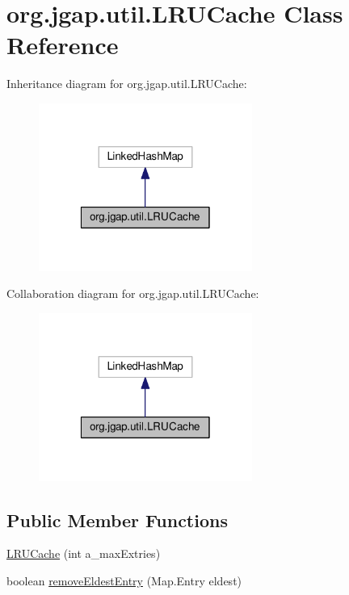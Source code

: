 \hypertarget{classorg_1_1jgap_1_1util_1_1_l_r_u_cache}{\section{org.\-jgap.\-util.\-L\-R\-U\-Cache Class Reference}
\label{classorg_1_1jgap_1_1util_1_1_l_r_u_cache}
}


Inheritance diagram for org.\-jgap.\-util.\-L\-R\-U\-Cache\-:
\nopagebreak
\begin{figure}[H]
\begin{center}
\leavevmode
\includegraphics[width=198pt]{classorg_1_1jgap_1_1util_1_1_l_r_u_cache__inherit__graph}
\end{center}
\end{figure}


Collaboration diagram for org.\-jgap.\-util.\-L\-R\-U\-Cache\-:
\nopagebreak
\begin{figure}[H]
\begin{center}
\leavevmode
\includegraphics[width=198pt]{classorg_1_1jgap_1_1util_1_1_l_r_u_cache__coll__graph}
\end{center}
\end{figure}
\subsection*{Public Member Functions}
\begin{DoxyCompactItemize}
\item 
\hyperlink{classorg_1_1jgap_1_1util_1_1_l_r_u_cache_a6be253518097710d97b2d3fbd9d14f20}{L\-R\-U\-Cache} (int a\-\_\-max\-Extries)
\item 
boolean \hyperlink{classorg_1_1jgap_1_1util_1_1_l_r_u_cache_a42b41b117997d2619e71e26474cf84d8}{remove\-Eldest\-Entry} (Map.\-Entry eldest)
\end{DoxyCompactItemize}
